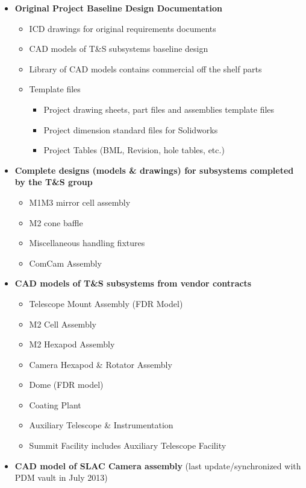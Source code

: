 \begin{itemize}
	\item {\bf Original Project Baseline Design Documentation}
	\begin{itemize}
		\item ICD drawings for original requirements documents
		\item CAD models of T\&S subsystems baseline design
		\item Library of CAD models contains commercial off the shelf parts
		\item Template files
		\begin{itemize}
			\item Project drawing sheets, part files and assemblies template files
			\item Project dimension standard files for Solidworks
			\item Project Tables (BML, Revision, hole tables, etc.)
		\end{itemize}
	\end{itemize}

	\item {\bf Complete designs (models \& drawings) for subsystems completed by the T\&S group}
	\begin{itemize}
		\item M1M3 mirror cell assembly
		\item M2 cone baffle
		\item Miscellaneous handling fixtures
		\item ComCam Assembly
	\end{itemize}

	\item {\bf CAD models of T\&S subsystems from vendor contracts}
	\begin{itemize}
		\item Telescope Mount Assembly (FDR Model)
		\item M2 Cell Assembly
		\item M2 Hexapod Assembly
		\item Camera Hexapod \& Rotator Assembly
		\item Dome (FDR model)
		\item Coating Plant
		\item Auxiliary Telescope \& Instrumentation
		\item Summit Facility includes Auxiliary Telescope Facility
	\end{itemize}

	\item{\bf CAD model of SLAC Camera assembly} (last update/synchronized with PDM vault in July 2013)

\end{itemize}
